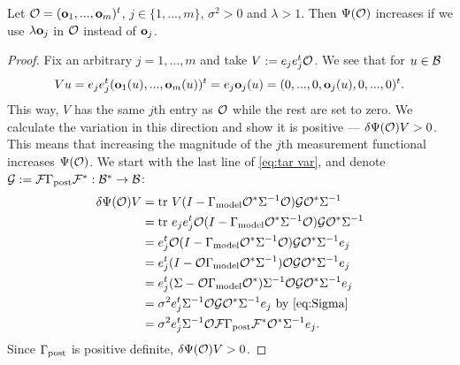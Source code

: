 \documentclass{amsart}
\numberwithin{equation}{section}
\begin{document}
\begin{proposition}\label{prop:bigger better}
  Let $\mathcal{O} = (\mathbf{o}_1,...,\mathbf{o}_m)^t$, $j \in \{1,...,m\}$, $\sigma^2
  > 0$ and $\lambda > 1$. Then $\Psi(\mathcal{O})$ increases if we use
  $\lambda \mathbf{o}_j$ in $\mathcal{O}$ instead of $\mathbf{o}_j$.
\end{proposition}
\begin{proof} 
  Fix an arbitrary $j=1,...,m$ and take $V:= e_j e_j^t \mathcal{O}$. We see
  that for $u \in \mathcal{B}$
  \begin{equation*}
    Vu = e_je_j^t (\mathbf{o}_1(u),...,\mathbf{o}_m(u) )^t = e_j \mathbf{o}_j(u)
    = (0,...,0,\mathbf{o}_j(u),0,...,0)^t.
  \end{equation*}
  This way, $V$ has the same $j$th entry as $\mathcal{O}$ while the rest are
  set to zero. We calculate the variation in this direction and show
  it is positive --- $\delta \Psi(\mathcal{O})V > 0$. This means that
  increasing the magnitude of the $j$th measurement functional
  increases $\Psi(\mathcal{O})$. We start with the last line of \eqref{eq:tar
    var}, and denote $\mathcal{G} : = \mathcal{F} \Gamma_{\textup{post}} \mathcal{F}^*: \mathcal{B}^* \to \mathcal{B}$:
  \begin{align*}
     \delta \Psi(\mathcal{O}) V 
    &= \textup{tr}\  V ( I - \Gamma_{\textup{model}} \mathcal{O}^*\Sigma^{-1}\mathcal{O}) \mathcal{G} \mathcal{O}^* \Sigma^{-1} \\
    &= \textup{tr}\  e_je_j^t \mathcal{O} ( I - \Gamma_{\textup{model}} \mathcal{O}^*\Sigma^{-1}\mathcal{O}) \mathcal{G} \mathcal{O}^* \Sigma^{-1} \\
    &= e_j^t \mathcal{O} ( I - \Gamma_{\textup{model}} \mathcal{O}^*\Sigma^{-1}\mathcal{O}) \mathcal{G} \mathcal{O}^* \Sigma^{-1}e_j \\
    &= e_j^t ( I - \mathcal{O} \Gamma_{\textup{model}} \mathcal{O}^*\Sigma^{-1})\mathcal{O} \mathcal{G} \mathcal{O}^* \Sigma^{-1}e_j \\  
    &=  e_j^t(\Sigma-\mathcal{O} \Gamma_{\textup{model}} \mathcal{O}^*) \Sigma^{-1}\mathcal{O} \mathcal{G} \mathcal{O}^* \Sigma^{-1}e_j \\
    &=\sigma^2 e_j^t \Sigma^{-1}\mathcal{O} \mathcal{G} \mathcal{O}^* \Sigma^{-1}e_j
    \text{ by \eqref{eq:Sigma} }\\
    &=\sigma^2 e_j^t \Sigma^{-1}\mathcal{O} \mathcal{F} \Gamma_{\textup{post}} \mathcal{F}^* \mathcal{O}^* \Sigma^{-1}e_j.
  \end{align*} 
  Since $\Gamma_{\textup{post}}$ is positive definite, $\delta \Psi(\mathcal{O}) V > 0$.
\end{proof}
\end{document}
